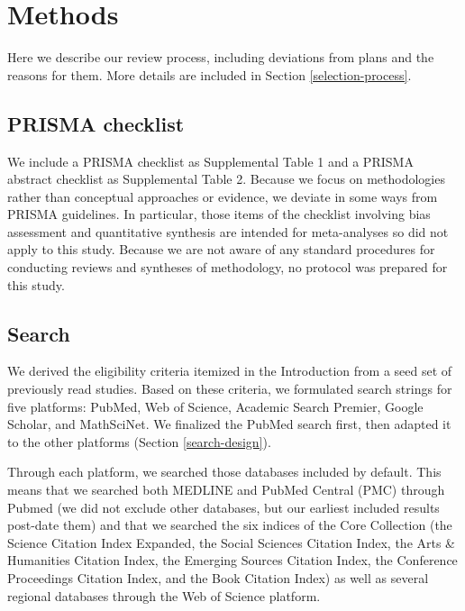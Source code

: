\documentclass{article}
\begin{document}
\hypertarget{methods}{%
\section{Methods}\label{methods}}

Here we describe our review process, including deviations from plans and
the reasons for them. More details are included in Section
\ref{selection-process}.

\hypertarget{prisma-checklist}{%
\subsection{PRISMA checklist}\label{prisma-checklist}}

We include a PRISMA checklist as Supplemental Table 1 and a PRISMA
abstract checklist as Supplemental Table 2. Because we focus on
methodologies rather than conceptual approaches or evidence, we deviate
in some ways from PRISMA guidelines. In particular, those items of the
checklist involving bias assessment and quantitative synthesis are
intended for meta-analyses so did not apply to this study. Because we
are not aware of any standard procedures for conducting reviews and
syntheses of methodology, no protocol was prepared for this study.

\hypertarget{search}{%
\subsection{Search}\label{search}}

We derived the eligibility criteria itemized in the Introduction from a
seed set of previously read studies. Based on these criteria, we
formulated search strings for five platforms: PubMed, Web of Science,
Academic Search Premier, Google Scholar, and MathSciNet. We finalized
the PubMed search first, then adapted it to the other platforms (Section
\ref{search-design}).

Through each platform, we searched those databases included by default.
This means that we searched both MEDLINE and PubMed Central (PMC)
through Pubmed (we did not exclude other databases, but our earliest
included results post-date them) and that we searched the six indices of
the Core Collection (the Science Citation Index Expanded, the Social
Sciences Citation Index, the Arts \& Humanities Citation Index, the
Emerging Sources Citation Index, the Conference Proceedings Citation
Index, and the Book Citation Index) as well as several regional
databases through the Web of Science platform.
\end{document}

